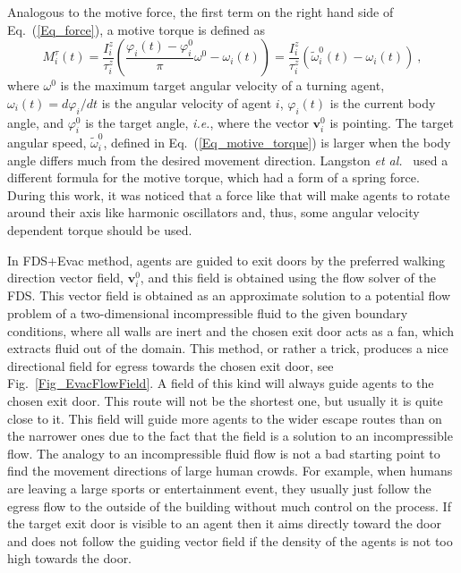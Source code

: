 \documentclass[12pt,a4paper,final,twoside]{stylevk}
\begin{document}
Analogous to the motive force, the first term on the right hand
side of Eq.~(\ref{Eq_force}), a motive torque is defined as
%
\begin{equation}\label{Eq_motive_torque}
  {M}^{\tau}_{i}  (t) = \frac{ I^z_{i} }{ \tau^z_{i} } \left(
  \frac{ \varphi_i(t) - \varphi^0_{i} }{\pi} \omega^0 - \omega_i(t)
  \right) = \frac{ I^z_{i} }{ \tau^z_{i} } \left( \tilde \omega^0_i
  (t) -  \omega_i (t) \right) ~, 
\end{equation}
%
where $\omega^0 $ is the maximum target angular velocity of a turning
agent, $\omega_i (t) = d\varphi_i/dt$ is the angular velocity of agent
$i$, $\varphi_i(t)$ is the current body angle, and $\varphi^0_{i}$ is
the target angle, \emph{i.e.}, where the vector $ \mathbf{v}_i^0 $ is
pointing.  The target angular speed, $\tilde \omega^0_i$, defined in
Eq.~(\ref{Eq_motive_torque}) is larger when the body angle differs
much from the desired movement direction.  Langston {\em et
  al.}~\cite{Langston06} used a different formula for the motive
torque, which had a form of a spring force.  During this work, it was
noticed that a force like that will make agents to rotate around their
axis like harmonic oscillators and, thus, some angular velocity
dependent torque should be used.


In FDS+Evac method, agents are guided to exit doors by the preferred
walking direction vector field, $ \mathbf{v}_i^0$, and this field is
obtained using the flow solver of the FDS.  This vector field is
obtained as an approximate solution to a potential flow problem of a
two-dimensional incompressible fluid to the given boundary conditions,
where all walls are inert and the chosen exit door acts as a fan,
which extracts fluid out of the domain.  This method, or rather a
trick, produces a nice directional field for egress towards the chosen
exit door, see Fig.~\ref{Fig_EvacFlowField}.  A field of this kind
will always guide agents to the chosen exit door.  This route will not
be the shortest one, but usually it is quite close to it.  This field
will guide more agents to the wider escape routes than on the narrower
ones due to the fact that the field is a solution to an incompressible
flow.  The analogy to an incompressible fluid flow is not a bad
starting point to find the movement directions of large human crowds.
For example, when humans are leaving a large sports or entertainment
event, they usually just follow the egress flow to the outside of the
building without much control on the process.  If the target exit door
is visible to an agent then it aims directly toward the door and does
not follow the guiding vector field if the density of the agents is
not too high towards the door.
\end{document}
